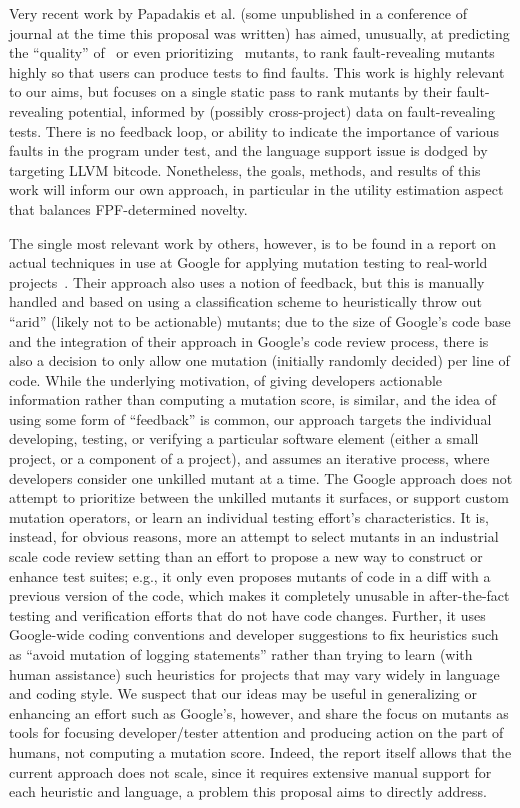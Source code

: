 Very recent work by Papadakis et al. (some unpublished in a conference
of journal at the time this proposal was written) has 
aimed, unusually, at predicting the ``quality'' of~\cite{MutQuality}
or even prioritizing~\cite{FaRM} mutants, to rank fault-revealing
mutants highly so that users can produce tests to find faults.  This
work is highly relevant to our aims, but focuses on a single static
pass to rank mutants by their fault-revealing potential, informed by
(possibly cross-project)
data on fault-revealing tests.  There is no feedback loop, or ability
to indicate the importance of various faults in the program under
test, and the language support issue is dodged by targeting LLVM
bitcode.  Nonetheless, the goals, methods, and results of this work
will inform our own approach, in particular in the utility estimation
aspect that balances FPF-determined novelty.

The single most relevant work by others, however, is to be found in a
report on actual techniques in use at Google for applying mutation
testing to real-world projects~\cite{MutGoogle}.  Their approach also
uses a notion of feedback, but this is manually handled and based on
using a classification scheme to heuristically throw out ``arid''
(likely not to be actionable)
mutants; due to the size of Google's code base and the integration of
their approach in Google's code review process, there is also a
decision to only allow one mutation (initially randomly decided) per
line of code.  While the underlying motivation, of giving developers
actionable information rather than computing a mutation score, is
similar, and the idea of using some form of ``feedback'' is common,
our approach targets the individual developing, testing, or verifying a particular software
element (either a small project, or a component of a project), and
assumes an iterative process, where developers consider one unkilled
mutant at a time.  The Google approach does not attempt to prioritize
between the unkilled mutants it surfaces, or support custom mutation
operators, or learn an individual testing effort's characteristics.
It is, instead, for obvious reasons, more an attempt to select mutants
in an industrial scale code review setting than an effort to propose a
new way to construct or enhance test suites; e.g., it only even
proposes mutants of code in a diff with a previous version of the
code, which makes it completely unusable in after-the-fact testing and
verification efforts that do not have code changes.  Further, it uses
Google-wide coding conventions and developer suggestions to fix
heuristics such as ``avoid mutation of logging statements'' rather
than trying to learn (with human assistance) such heuristics for
projects that may vary widely in language and coding style.  We
suspect that our ideas may be useful in generalizing or enhancing an
effort such as Google's, however, and share the focus on mutants as
tools for focusing developer/tester attention and producing action on the
part of humans, not computing a mutation score.  Indeed, the report
itself allows that the current approach does not scale, since it
requires extensive manual support for each heuristic and language, a
problem this proposal aims to directly address.

